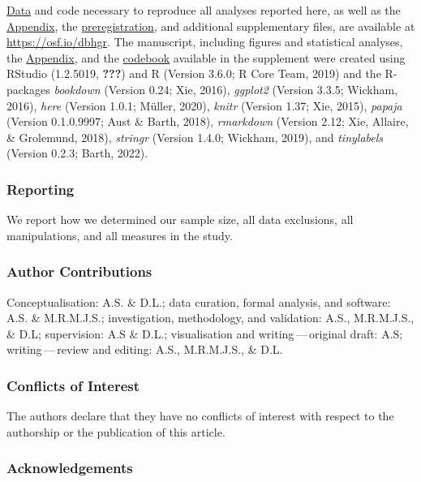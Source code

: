 \documentclass[british,,man,floatsintext]{apa6}
\begin{document}
\href{https://osf.io/aqr2s/}{Data} and code necessary to reproduce all analyses reported here, as well as the \href{https://osf.io/qw798/}{Appendix}, the \href{https://osf.io/sy927/}{preregistration}, and additional supplementary files, are available at \url{https://osf.io/dbhgr}.
The manuscript, including figures and statistical analyses, the \href{https://osf.io/qw798/}{Appendix}, and the \href{https://osf.io/6jrkz/}{codebook} available in the supplement were created using RStudio (1.2.5019, {\textbf{???}}) and R (Version 3.6.0; R Core Team, 2019) and the R-packages \emph{bookdown} (Version 0.24; Xie, 2016), \emph{ggplot2} (Version 3.3.5; Wickham, 2016), \emph{here} (Version 1.0.1; Müller, 2020), \emph{knitr} (Version 1.37; Xie, 2015), \emph{papaja} (Version 0.1.0.9997; Aust \& Barth, 2018), \emph{rmarkdown} (Version 2.12; Xie, Allaire, \& Grolemund, 2018), \emph{stringr} (Version 1.4.0; Wickham, 2019), and \emph{tinylabels} (Version 0.2.3; Barth, 2022).

\hypertarget{reporting}{%
\subsubsection{Reporting}\label{reporting}}

We report how we determined our sample size, all data exclusions, all manipulations, and all measures in the study.

\hypertarget{author-contributions}{%
\subsubsection{Author Contributions}\label{author-contributions}}

Conceptualisation: A.S. \& D.L.; data curation, formal analysis, and software: A.S. \& M.R.M.J.S.; investigation, methodology, and validation: A.S., M.R.M.J.S., \& D.L; supervision: A.S \& D.L.; visualisation and writing\(\,\)---\(\,\)original draft: A.S; writing\(\,\)---\(\,\)review and editing: A.S., M.R.M.J.S., \& D.L.

\hypertarget{conflicts-of-interest}{%
\subsubsection{Conflicts of Interest}\label{conflicts-of-interest}}

The authors declare that they have no conflicts of interest with respect to the authorship or the publication of this article.

\hypertarget{acknowledgements}{%
\subsubsection{Acknowledgements}\label{acknowledgements}}
\end{document}
